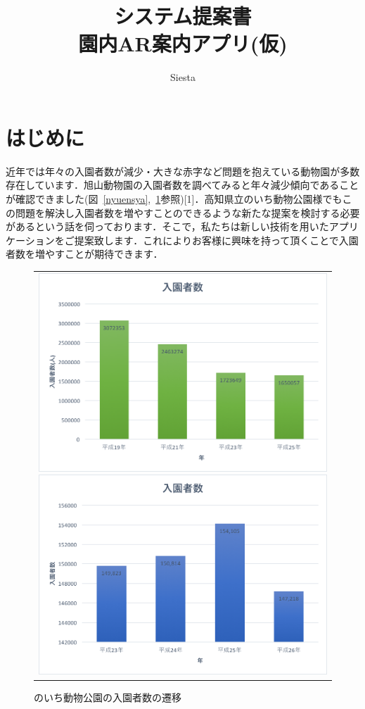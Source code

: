 \documentclass[a4j]{jarticle}
\title{
\vspace{30mm}
{\bf システム提案書} 
\\
\vspace{5mm}
{\bf 園内AR案内アプリ(仮)}
\vspace{90mm}
}
\author{
\vspace{5mm}
Siesta \\
}
\begin{document}
\maketitle

\newpage

\tableofcontents

\newpage

\section{はじめに}
近年では年々の入園者数が減少・大きな赤字など問題を抱えている動物園が多数存在しています．旭山動物園の入園者数を調べてみると年々減少傾向であることが確認できました(図~\ref{nyuensya},~\ref{noichi}参照)[1]．高知県立のいち動物公園様でもこの問題を解決し入園者数を増やすことのできるような新たな提案を検討する必要があるという話を伺っております．そこで，私たちは新しい技術を用いたアプリケーションをご提案致します．これによりお客様に興味を持って頂くことで入園者数を増やすことが期待できます．

\begin{figure}[htb]
	\begin{center}
		\begin{tabular}{c}
			\begin{minipage}{0.5\hsize}
				\begin{center}
					\includegraphics[width=0.6 \linewidth]{nyuensya.png}
					\caption{旭山動物園の入園者数の遷移}
					\label{nyuensya}
				\end{center}
			\end{minipage}
			\begin{minipage}{0.5\hsize}
				\begin{center}
					\includegraphics[width=0.6 \linewidth]{noichi.png}
					\caption{のいち動物公園の入園者数の遷移}
					\label{noichi}
				\end{center}
			\end{minipage}
		\end{tabular}
	\end{center}
\end{figure}
\end{document}
